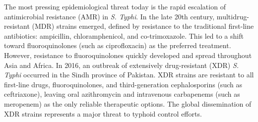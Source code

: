 The most pressing epidemiological threat today is the rapid escalation of antimicrobial resistance (AMR) in \textit{S. Typhi}. In the late 20th century, multidrug-resistant (MDR) strains emerged, defined by resistance to the traditional first-line antibiotics: ampicillin, chloramphenicol, and co-trimoxazole. This led to a shift toward fluoroquinolones (such as ciprofloxacin) as the preferred treatment. However, resistance to fluoroquinolones quickly developed and spread throughout Asia and Africa. In 2016, an outbreak of extensively drug-resistant (XDR) \textit{S. Typhi} occurred in the Sindh province of Pakistan. XDR strains are resistant to all first-line drugs, fluoroquinolones, and third-generation cephalosporins (such as ceftriaxone), leaving oral azithromycin and intravenous carbapenems (such as meropenem) as the only reliable therapeutic options. The global dissemination of XDR strains represents a major threat to typhoid control efforts.

